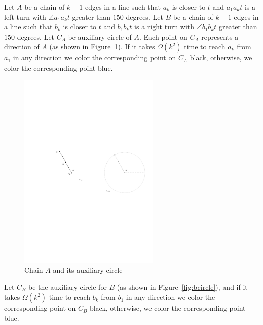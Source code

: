 \documentclass [letterpaper] {patmorin}
\begin{document}
Let $A$ be a chain of $k-1$ edges in a line such that $a_{k}$ is closer to $t$ and $a_{1}a_{k}t$ is a left turn with $\angle a_{1}a_{k}t$ greater than $150$ degrees. Let $B$ be a chain of $k-1$ edges in a line such that $b_{k}$ is closer to $t$ and $b_{1}b_{k}t$ is a right turn with $\angle b_{1}b_{k}t$ greater than $150$ degrees. Let $C_{A}$ be auxiliary circle of $A$. Each point on $C_{A}$ represents a direction of $A$ (as shown in Figure~\ref{fig:acircle}). If it takes $\Omega (k^{2})$ time to reach $a_{k}$ from $a_{1}$ in any direction we color the corresponding point on $C_{A}$ black, otherwise, we color the corresponding point blue.
\begin{figure}[ht]
  \centering
  \includegraphics[width=0.6\textwidth]{pics/achaincircle.pdf}
  \caption{Chain $A$ and its auxiliary circle}
  \label{fig:acircle}
\end{figure}
Let $C_{B}$ be the auxiliary circle for $B$ (as shown in Figure~\ref{fig:bcircle}), and if it takes $\Omega (k^{2})$ time to reach $b_{k}$ from $b_{1}$ in any direction we color the corresponding point on $C_{B}$ black, otherwise, we color the corresponding point blue.
\end{document}
